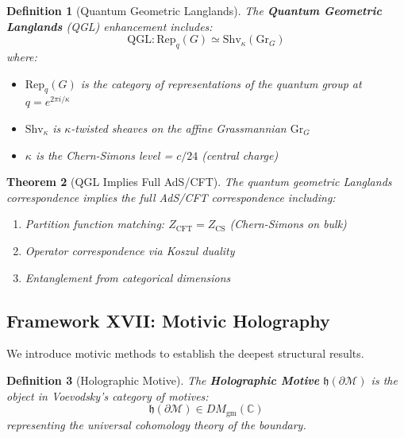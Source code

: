 \documentclass[12pt,a4paper]{article}
\newtheorem{theorem}{Theorem}[section]
\newtheorem{definition}[theorem]{Definition}
\begin{document}
\begin{definition}[Quantum Geometric Langlands]\label{def:qgl}
The \textbf{Quantum Geometric Langlands} (QGL) enhancement includes:
\begin{equation}
\text{QGL}: \text{Rep}_q(G) \simeq \text{Shv}_{\kappa}(\text{Gr}_G)
\end{equation}
where:
\begin{itemize}
    \item $\text{Rep}_q(G)$ is the category of representations of the quantum group at $q = e^{2\pi i/\kappa}$
    \item $\text{Shv}_\kappa$ is $\kappa$-twisted sheaves on the affine Grassmannian $\text{Gr}_G$
    \item $\kappa$ is the Chern-Simons level = $c/24$ (central charge)
\end{itemize}
\end{definition}

\begin{theorem}[QGL Implies Full AdS/CFT]\label{thm:qgl-adscft}
The quantum geometric Langlands correspondence implies the full AdS/CFT correspondence including:
\begin{enumerate}
    \item Partition function matching: $Z_{\text{CFT}} = Z_{\text{CS}}$ (Chern-Simons on bulk)
    \item Operator correspondence via Koszul duality
    \item Entanglement from categorical dimensions
\end{enumerate}
\end{theorem}

\subsection{Framework XVII: Motivic Holography}

We introduce motivic methods to establish the deepest structural results.

\begin{definition}[Holographic Motive]\label{def:holo-motive}
The \textbf{Holographic Motive} $\mathfrak{h}(\partial\mathcal{M})$ is the object in Voevodsky's category of motives:
\begin{equation}
\mathfrak{h}(\partial\mathcal{M}) \in DM_{\text{gm}}(\mathbb{C})
\end{equation}
representing the universal cohomology theory of the boundary.
\end{definition}
\end{document}
